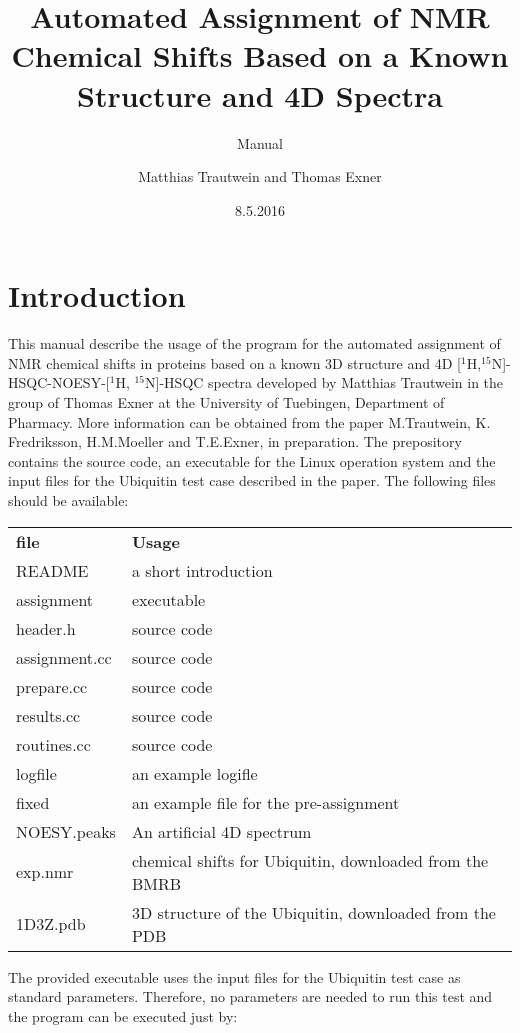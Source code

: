 \documentclass{scrartcl}
\begin{document}
\title{ Automated Assignment of NMR Chemical Shifts Based on a Known Structure and 4D Spectra}
\subtitle{Manual}
\author{Matthias Trautwein and Thomas Exner}
\date{8.5.2016}
\maketitle
\section{Introduction}
This manual describe the usage of the program for the automated assignment of NMR chemical shifts in proteins based on a known 3D structure and 4D [$^1$H,$^{15}$N]-HSQC-NOESY-[$^1$H, $^{15}$N]-HSQC  spectra developed by Matthias Trautwein in the group of Thomas Exner at the University of Tuebingen, Department of Pharmacy.  More information can be obtained from the paper M.Trautwein, K. Fredriksson, H.M.Moeller and T.E.Exner, in preparation. The prepository contains the source code, an executable for the Linux operation system and the input files for the Ubiquitin test case described in the paper.
\noindent
The following files should be available:
\begin{table}[htbp]
\begin{center}
\begin{tabular}{ll}
\textbf{file} & \textbf{Usage} \\
README     & a short introduction \\
assignment & executable \\
header.h   & source code \\
assignment.cc & source code \\
prepare.cc  & source code \\
results.cc  & source code \\
routines.cc & source code \\
logfile     & an example logifle \\
fixed       & an example file for the pre-assignment \\
NOESY.peaks & An artificial 4D spectrum \\
exp.nmr   & chemical shifts for Ubiquitin, downloaded from the BMRB \\
1D3Z.pdb  & 3D structure of the Ubiquitin, downloaded from the PDB
\end{tabular}
\end{center}
\end{table}

The provided executable uses the input files for the Ubiquitin test case as standard parameters. Therefore, no parameters are needed to run this test and the program can be executed just by: 
\end{document}
